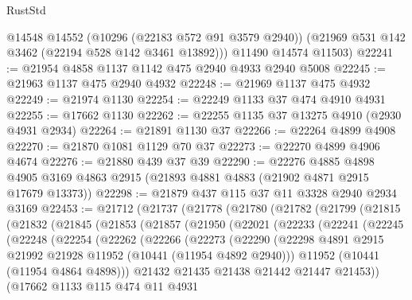 \begin{lexlean}{RustStd}
\begin{coremodule}
        @14548
        @14552
        (@10296 (@22183 @572 @91 @3579 @2940))
        (@21969 @531 @142 @3462 (@22194 @528 @142 @3461 @13892)))
      @11490
      @14574
      @11503)
@22241 := @21954 @4858 @1137 @1142 @475 @2940 @4933 @2940 @5008
@22245 := @21963 @1137 @475 @2940 @4932
@22248 := @21969 @1137 @475 @4932
@22249 := @21974 @1130
@22254 := @22249 @1133 @37 @474 @4910 @4931
@22255 := @17662 @1130
@22262 := @22255 @1135 @37 @13275 @4910 (@2930 @4931 @2934)
@22264 := @21891 @1130 @37
@22266 := @22264 @4899 @4908
@22270 := @21870 @1081 @1129 @70 @37
@22273 := @22270 @4899 @4906 @4674
@22276 := @21880 @439 @37 @39
@22290 := @22276
    @4885
    @4898
    @4905
    @3169
    @4863
    @2915
    (@21893 @4881 @4883 (@21902 @4871 @2915 @17679 @13373))
@22298 := @21879 @437 @115 @37 @11 @3328 @2940 @2934 @3169
@22453 := @21712
    (@21737
      (@21778
        (@21780
          (@21782
            (@21799
              (@21815
                (@21832
                  (@21845
                    (@21853
                      (@21857
                        (@21950
                          (@22021
                            (@22233
                              (@22241
                                (@22245
                                  (@22248
                                    (@22254
                                      (@22262
                                        (@22266
                                          (@22273
                                            (@22290
                                              (@22298
                                                @4891
                                                @2915
                                                @21992
                                                @21928
                                                @11952
                                                (@10441 (@11954 @4892 @2940)))
                                              @11952
                                              (@10441 (@11954 @4864 @4898)))
                                            @21432
                                            @21435
                                            @21438
                                            @21442
                                            @21447
                                            @21453))
                                        (@17662
                                          @1133
                                          @115
                                          @474
                                          @11
                                          @4931

\end{coremodule}
\end{lexlean}
